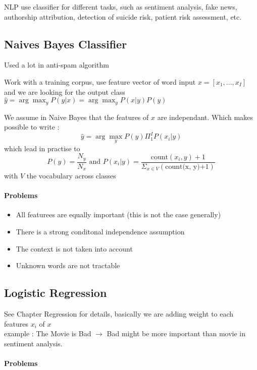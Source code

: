 		NLP use classifier for different tasks, such as sentiment analysis, fake news, authorship  attribution, detection of suicide risk, patient risk assessment, etc.

		\subsection{Naives Bayes Classifier}

			Used a lot in anti-spam algorithm

			Work with a training corpus, use feature vector of word input $x = [x_1, ..., x_I]$
			and we are looking for the output class $\hat y = \arg \max_y P(y|x) = \arg \max_y P(x | y)P(y)$

			We assume in Naive Bayes that the features of $x$ are independant. Which makes possible to write : 
			\[
				\hat y = \arg \max_y P(y) \Pi_1^I P(x_i | y)
			\]
			which lead in practise to
			\[
				P(y) = \frac{N_y}{N_x} \text{ and } P(x_i | y) = \frac{\text{count}(x_i, y)+1}{\Sigma_{x\in V}(\text{count(x, y)+1})}
			\] with $V$ the vocabulary across classes

			\paragraph*{Problems}

				\begin{itemize}
					\item All featurees are equally important (this is not the case generally)
					\item There is a strong conditonal independence assumption
					\item The context is not taken into account
					\item Unknown words are not tractable
				\end{itemize}

		\subsection{Logistic Regression}
			See Chapter Regression for details, basically we are adding weight to each features $x_i$ of $x$ \\
			example : The Movie is Bad $\rightarrow$ Bad might be more important than movie in sentiment analysis.

			\paragraph*{Problems}
				
